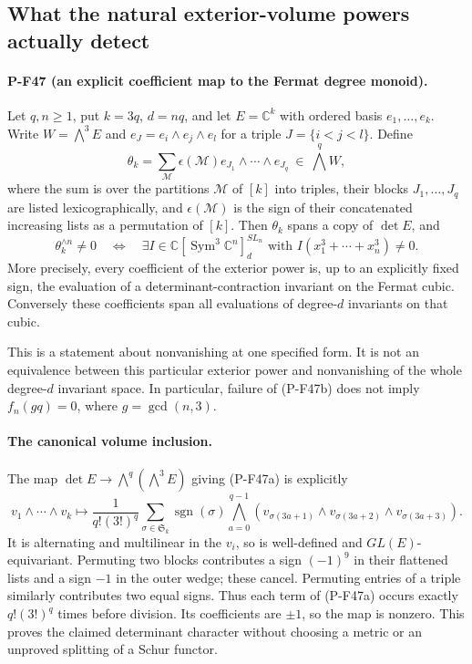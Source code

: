 \subsection{What the natural exterior-volume powers actually detect}
\label{sec:exterior-volume-fermat}

\paragraph{P-F47 (an explicit coefficient map to the Fermat degree monoid).}
Let $q,n\ge1$, put $k=3q$, $d=nq$, and let
$E=\mathbb C^k$ with ordered basis $e_1,\ldots,e_k$.
Write $W=\bigwedge^3E$ and $e_J=e_i\wedge e_j\wedge e_l$
for a triple $J=\{i<j<l\}$. Define
\[
 \theta_k=\sum_{\mathcal M}\epsilon(\mathcal M)
                    e_{J_1}\wedge\cdots\wedge e_{J_q}
       \ \in\ \bigwedge^qW,                         \tag{P-F47a}
\]
where the sum is over the partitions $\mathcal M$ of $[k]$
into triples, their blocks $J_1,\ldots,J_q$ are listed
lexicographically, and $\epsilon(\mathcal M)$ is the sign
of their concatenated increasing lists as a permutation
of $[k]$. Then $\theta_k$ spans a copy of $\det E$, and
\[
 \theta_k^{\wedge n}\ne0
 \quad\Longleftrightarrow\quad
 \exists I\in\mathbb C[\operatorname{Sym}^3\mathbb C^n]^{SL_n}_d
             \text{ with }I(x_1^3+\cdots+x_n^3)\ne0.
                                                        \tag{P-F47b}
\]
More precisely, every coefficient of the exterior power
is, up to an explicitly fixed sign, the evaluation of a
determinant-contraction invariant on the Fermat cubic.
Conversely these coefficients span all evaluations of
degree-$d$ invariants on that cubic.

This is a statement about nonvanishing at one specified
form. It is not an equivalence between this particular
exterior power and nonvanishing of the whole degree-$d$
invariant space. In particular, failure of (P-F47b) does
not imply $f_n(gq)=0$, where $g=\gcd(n,3)$.

\paragraph{The canonical volume inclusion.}
The map $\det E\longrightarrow\bigwedge^q(\bigwedge^3E)$
giving (P-F47a) is explicitly
\[
 v_1\wedge\cdots\wedge v_k\longmapsto
 \frac{1}{q!(3!)^q}\sum_{\sigma\in\mathfrak S_k}
 \operatorname{sgn}(\sigma)
 \bigwedge_{a=0}^{q-1}
 (v_{\sigma(3a+1)}\wedge v_{\sigma(3a+2)}
                          \wedge v_{\sigma(3a+3)}).
                                                        \tag{P-F47c}
\]
It is alternating and multilinear in the $v_i$, so is
well-defined and $GL(E)$-equivariant. Permuting two
blocks contributes a sign $(-1)^9$ in their flattened
lists and a sign $-1$ in the outer wedge; these cancel.
Permuting entries of a triple similarly contributes
two equal signs. Thus each term of (P-F47a) occurs
exactly $q!(3!)^q$ times before division. Its coefficients
are $\pm1$, so the map is nonzero. This proves the
claimed determinant character without choosing a
metric or an unproved splitting of a Schur functor.

